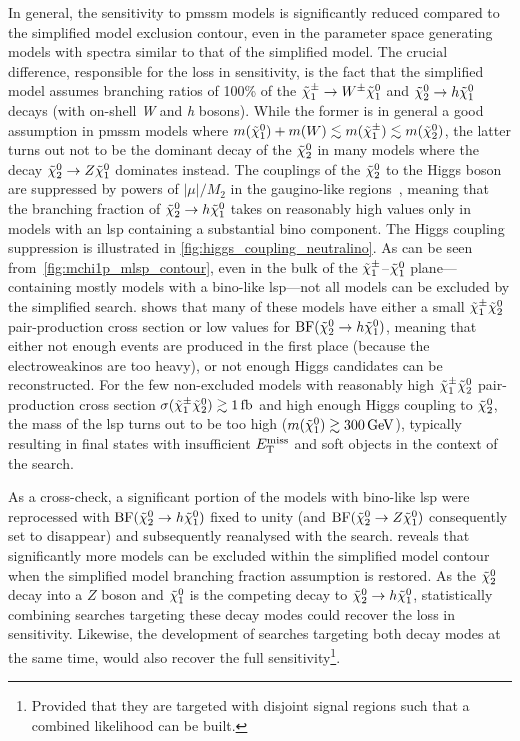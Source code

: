 In general, the sensitivity to \gls{pmssm} models is significantly reduced compared to the simplified model exclusion contour, even in the parameter space generating models with spectra similar to that of the simplified model. The crucial difference, responsible for the loss in sensitivity, is the fact that the simplified model assumes branching ratios of 100\% of the $\tilde{\chi}_1^\pm \rightarrow W^\pm \tilde{\chi}_1^0$ and $\tilde{\chi}_2^0 \rightarrow h \tilde{\chi}_1^0$ decays (with on-shell \textit{W} and \textit{h} bosons).
While the former is in general a good assumption in \gls{pmssm} models where $m(\tilde{\chi}_1^0)+m(W) \lesssim m(\tilde{\chi}_1^\pm)\lesssim m(\tilde{\chi}_2^0)$, the latter turns out not to be the dominant decay of the $\tilde{\chi}_2^0$ in many models where the decay $\tilde{\chi}_2^0 \rightarrow Z \tilde{\chi}_1^0$ dominates instead.
The couplings of the $\tilde{\chi}_2^0$ to the Higgs boson are suppressed by powers of $\vert\mu\vert/M_2$ in the gaugino-like regions~\cite{Arbey:2012fa}, meaning that the branching fraction of $\tilde{\chi}_2^0 \rightarrow h \tilde{\chi}_1^0$ takes on reasonably high values only in models with an \gls{lsp} containing a substantial bino component.
The Higgs coupling suppression is illustrated in \cref{fig:higgs_coupling_neutralino}. As can be seen from~\cref{fig:mchi1p_mlsp_contour}, even in the bulk of the $\tilde{\chi}_1^\pm$--$\tilde{\chi}_1^0$ plane---containing mostly models with a bino-like \gls{lsp}---not all models can be excluded by the simplified \onelepton search.
 shows that many of these models have either a small $\tilde{\chi}_1^\pm\tilde{\chi}_2^0$ pair-production cross section or low values for $\mathrm{BF}(\tilde{\chi}_2^0 \rightarrow h \tilde{\chi}_1^0)$, meaning that either not enough events are produced in the first place (because the electroweakinos are too heavy), or not enough Higgs candidates can be reconstructed.
For the few non-excluded models with reasonably high $\tilde{\chi}_1^\pm\tilde{\chi}_2^0$ pair-production cross section $\sigma(\charg\neutr) \gtrsim\SI{1}{\femto\barn}$ and high enough Higgs coupling to $\tilde{\chi}_2^0$, the mass of the \gls{lsp} turns out to be too high ($m(\lsp)\gtrsim \SI{300}{\GeV}$), typically resulting in final states with insufficient $E_{\textrm{T}}^{\textrm{miss}}$ and soft objects in the context of the \onelepton search.  

As a cross-check, a significant portion of the models with bino-like \gls{lsp} were reprocessed with $\mathrm{BF}(\tilde{\chi}_2^0 \rightarrow h \tilde{\chi}_1^0)$ fixed to unity (and $\mathrm{BF}(\tilde{\chi}_2^0 \rightarrow Z \tilde{\chi}_1^0)$ consequently set to disappear) and subsequently reanalysed with the \onelepton search.
 reveals that significantly more models can be excluded within the simplified model contour when the simplified model branching fraction assumption is restored. As the $\tilde{\chi}_2^0$ decay into a $Z$ boson and $\tilde{\chi}_1^0$ is the competing decay to $\tilde{\chi}_2^0 \rightarrow h \tilde{\chi}_1^0$, statistically combining searches targeting these decay modes could recover the loss in sensitivity. Likewise, the development of searches targeting both decay modes at the same time, would also recover the full sensitivity\footnote{Provided that they are targeted with disjoint signal regions such that a combined likelihood can be built.}.  

